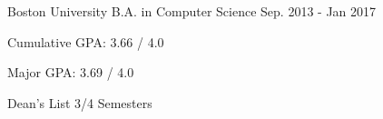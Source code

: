 


\eduentry
{Boston University} %
{B.A. in Computer Science} %
{Sep. 2013 - Jan 2017} %
{ %
\begin{cvitems}
\item Cumulative GPA: 3.66 / 4.0
\item Major GPA: 3.69 / 4.0
\item Dean's List 3/4 Semesters
\end{cvitems}
}


